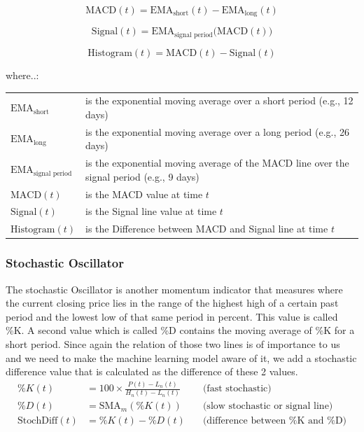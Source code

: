 \documentclass[a4paper,12pt]{report}
\begin{document}
\[
\text{MACD}(t) = \text{EMA}_{\text{short}}(t) - \text{EMA}_{\text{long}}(t)
\]

\[
\text{Signal}(t) = \text{EMA}_{\text{signal period}} \big(\text{MACD}(t)\big)
\]

\[
\text{Histogram}(t) = \text{MACD}(t) - \text{Signal}(t)
\]

where..:\\

\begin{tabularx}{\textwidth}{@{}l@{\hspace{2em}--\hspace{2em}}X@{}}
  $\text{EMA}_{\text{short}}$       & is the exponential moving average over a short period (e.g., 12 days) \\
  $\text{EMA}_{\text{long}}$        & is the exponential moving average over a long period (e.g., 26 days) \\
  $\text{EMA}_{\text{signal period}}$ & is the exponential moving average of the MACD line over the signal period (e.g., 9 days) \\
  $\text{MACD}(t)$                  & is the MACD value at time $t$ \\
  $\text{Signal}(t)$                & is the Signal line value at time $t$ \\
  $\text{Histogram}(t)$             & is the Difference between MACD and Signal line at time $t$ \\
\end{tabularx}

			\subsubsection{Stochastic Oscillator}
			
The stochastic Oscillator is another momentum indicator that measures where the current closing price lies in the range of the highest high of a certain past period and the lowest low of that same period in percent. This value is called \%K. A second value which is called \%D contains the moving average of \%K for a short period. Since again the relation of those two lines is of importance to us and we need to make the machine learning model aware of it, we add a stochastic difference value that is calculated as the difference of these 2 values. \cite{25}\\

\[
\begin{aligned}
  \%K(t) &= 100 \times \frac{P(t) - L_n(t)}{H_n(t) - L_n(t)} \quad & \text{(fast stochastic)} \\
  \%D(t) &= \text{SMA}_m(\%K(t)) \quad & \text{(slow stochastic or signal line)} \\
  \text{StochDiff}(t) &= \%K(t) - \%D(t) \quad & \text{(difference between \%K and \%D)} \\
\end{aligned}
\]
\end{document}
